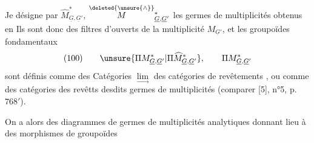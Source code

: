 Je désigne par $\widehat M^*_{\underline G,\underline G'}$, $\overset{\deleted{\unsure{\wedge}}}{M}{}^*_{\underline G,\underline G'}$ les germes de multiplicités obtenus en 
Ils sont donc des filtres d'ouverts de la multiplicité $M_{\underline G'}$, et les groupoïdes fondamentaux \deleted{$\unsure{\Pi}$}
\[
(100)\qquad\unsure{\Pi M^*_{\underline G,\underline G'}|\Pi\widehat M^*_{\underline G,\underline G'}},\qquad\Pi M^*_{\underline G,\underline G'}
\]
sont définis comme des Catégories $\underset{\longrightarrow}{\lim}$ des catégories de revêtements , ou comme des catégories des revêtts  desdits germes de multiplicités (comparer [5], n°5, p. $768'$).

On a alors des diagrammes de germes de multiplicités analytiques
donnant lieu à des morphismes de groupoïdes

